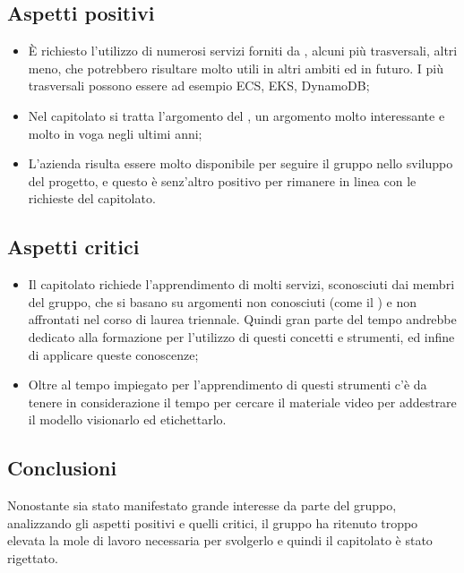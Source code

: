 \subsection{Aspetti positivi}
\begin{itemize}
\item \`E richiesto l'utilizzo di numerosi servizi forniti da , alcuni più trasversali, altri meno, che potrebbero risultare molto utili in altri ambiti ed in futuro. I più trasversali possono essere ad esempio ECS, EKS, DynamoDB;
\item Nel capitolato si tratta l'argomento del , un argomento molto interessante e molto in voga negli ultimi anni;
\item L'azienda risulta essere molto disponibile per seguire il gruppo nello sviluppo del progetto, e questo è senz'altro positivo per rimanere in linea con le richieste del capitolato.
\end{itemize}

\subsection{Aspetti critici}
\begin{itemize}
\item Il capitolato richiede l'apprendimento di molti servizi, sconosciuti dai membri del gruppo, che si basano su argomenti non conosciuti (come il ) e non affrontati nel corso di laurea triennale. Quindi gran parte del tempo andrebbe dedicato alla formazione per l'utilizzo di questi concetti e strumenti, ed infine di applicare queste conoscenze;
\item Oltre al tempo impiegato per l'apprendimento di questi strumenti c'è da tenere in considerazione il tempo per cercare il materiale video per addestrare il modello visionarlo ed etichettarlo.
\end{itemize}

\subsection{Conclusioni}
Nonostante sia stato manifestato grande interesse da parte del gruppo, analizzando gli aspetti positivi e quelli critici, il gruppo ha ritenuto troppo elevata la mole di lavoro necessaria per svolgerlo e quindi il capitolato è stato rigettato.

